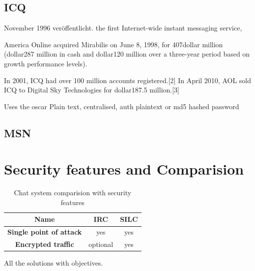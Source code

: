 \subsection{ICQ}
November 1996 veröffentlicht.
 the first Internet-wide instant messaging service, 

America Online acquired Mirabilis on June 8, 1998, for 407dollar million (dollar287 million in cash and dollar120 million over a three-year period based on growth performance levels).

In 2001, ICQ had over 100 million accounts registered.[2] In April 2010, AOL sold ICQ to Digital Sky Technologies for dollar187.5 million.[3]

Uses the oscar \cite{oscar}
Plain text, centralised, auth plaintext or md5 hashed password

\subsection{MSN}

\section{Security features and Comparision}

\begin{longtable}{|c|c|c|}
\caption{Chat system comparision with security features}\\
\hline
\textbf{Name} & \textbf{IRC} & \textbf{SILC}\\
\hline
\textbf{Single point of attack} & yes & yes\\
\hline
\textbf{Encrypted traffic} & optional & yes\\
\hline
\end{longtable}

All the solutions with objectives.
